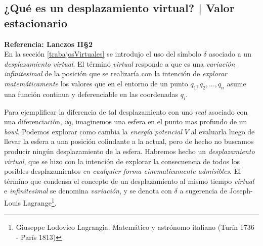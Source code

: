 \documentclass[12pt, spanish, a4paper, ]{article}
\begin{document}



\subsection{¿Qué es un desplazamiento virtual? | Valor estacionario}\label{desplazamientoVirtual}
\textbf{Referencia: Lanczos II\S2}\\

En la sección \ref{trabajosVirtuales} se introdujo el uso del símbolo \(\delta\) asociado a un \emph{desplazamiento virtual}.
El término \emph{virtual} responde a que es una \emph{variación infinitesimal} de la posición que se realizaría con la intención de \emph{explorar matemáticamente} los valores que en el entorno de un punto \(q_1, q_2, \ldots, q_n\) asume una función continua y deferenciable en las coordenadas \(q_i\).

Para ejemplificar la diferencia de tal desplazamiento con uno \emph{real} asociado con una diferenciación, \(\dd q\), imaginemos una esfera en el punto mas profundo de un \emph{bowl}.
Podemos explorar como cambia la \emph{energía potencial} \(V\) al evaluarla luego de llevar la esfera a una posición colindante a la actual, pero de hecho no buscamos producir ningún desplazamiento de la esfera.
Habremos hecho un \emph{desplazamiento virtual}, que se hizo con la intención de explorar la consecuencia de todos los posibles desplazamientos \emph{en cualquier forma cinematicamente admisibles}.
El término que condensa el concepto de un desplazamiento al mismo tiempo \emph{virtual} e \emph{infinitesimal} se denomina \emph{variación}, y se denota con \(\delta\) a sugerencia de Joseph-Louis Lagrange\footnote{Giuseppe Lodovico Lagrangia. Matemático y astrónomo italiano (Turín 1736 - París 1813)}.
\end{document}
